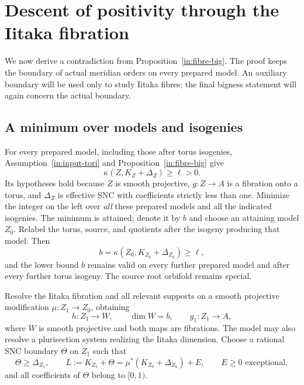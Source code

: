 \section{Descent of positivity through the Iitaka fibration}
\label{in:descent}

We now derive a contradiction from Proposition~\ref{in:fibre-big}.
The proof keeps the boundary of actual meridian orders on every
prepared model.  An auxiliary boundary will be used only to study
Iitaka fibres; the final bigness statement will again concern the
actual boundary.

\subsection{A minimum over models and isogenies}

For every prepared model, including those after torus isogenies,
Assumption~\ref{in:input-tori} and Proposition~\ref{in:fibre-big} give
\begin{equation}\label{in:adjoint-lower-bound}
 \kappa(Z,K_Z+\Delta_Z)\ge\ell>0.
\end{equation}
Its hypotheses hold because $Z$ is smooth projective, $g:Z\to A$
is a fibration onto a torus, and $\Delta_Z$ is effective SNC with
coefficients strictly less than one.  Minimize the integer on the
left over \emph{all} these prepared models and all the indicated
isogenies.  The minimum is attained; denote it by $b$ and choose an
attaining model $Z_0$.  Relabel the torus, source, and quotients after
the isogeny producing that model.  Then
\begin{equation}\label{in:adjoint-minimum}
 b=\kappa(Z_0,K_{Z_0}+\Delta_{Z_0})\ge\ell,
\end{equation}
and the lower bound $b$ remains valid on every further prepared model
and after every further torus isogeny.  The source root orbifold
remains special.

Resolve the Iitaka fibration and all relevant supports on a smooth
projective modification $\mu:Z_1\to Z_0$, obtaining
\[
 h:Z_1\longrightarrow W,
 \qquad \dim W=b,
 \qquad g_1:Z_1\longrightarrow A,
\]
where $W$ is smooth projective and both maps are fibrations.  The
model may also resolve a plurisection system realizing the Iitaka
dimension.  Choose a rational SNC boundary $\Theta$ on $Z_1$ such
that
\begin{equation}\label{in:auxiliary-boundary}
 \Theta\ge\Delta_{Z_1},\qquad
 L:=K_{Z_1}+\Theta
 =\mu^*(K_{Z_0}+\Delta_{Z_0})+E,
 \qquad E\ge0\text{ exceptional},
\end{equation}
and all coefficients of $\Theta$ belong to $[0,1)$.

